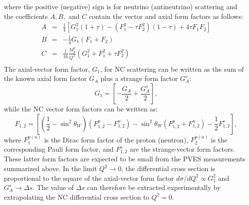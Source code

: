 where the positive (negative) sign is for neutrino (antineutrino) scattering and the coefficients
$A, B,$ and $C$ contain the vector and axial form factors as follows:
\begin{eqnarray*}
A & = &  \frac{1}{4} \left[ G_1^2 \left( 1 +\tau \right) - \left( F_1^2 - \tau F_2^2 \right)
\left( 1 - \tau \right) + 4 \tau F_1 F_2 \right]\\
B & = &- \frac{1}{4} G_1 \left( F_1 + F_2 \right)\\
C & = &  \frac{1}{16} \frac{M_p^2}{Q^2} \left( G_1^2 + F_1^2 + \tau F_2^2 \right) \\
\end{eqnarray*}
The axial-vector form factor, $G_1$, for NC scattering can be written as the sum of the known axial
form factor $G_A$ plus a strange form factor $G_A^s$:
\begin{equation}
G_1 = \left[ - \frac{G_A}{2} + \frac{G_A^s}{2} \right],
\end{equation}
while the NC vector form factors can be written as:
\begin{equation}
F_{1,2} = \left[ \left(\frac{1}{2} - \sin^2 \theta_W \right) \left( F_{1,2}^p - F_{1,2}^n \right)
- \sin^2 \theta_W \left( F_{1,2}^p + F_{1,2}^n \right) - \frac{1}{2} F_{1,2}^s \right],
\end{equation}
where $F_1^{p(n)}$ is the Dirac form factor of the proton (neutron),
$F_2^{p(n)}$ is the corresponding Pauli form factor, and $F_{1,2}^s$
are the strange-vector form factors.  These latter form factors are
expected to be small from the PVES measurements summarized above.  
In the limit $Q^2 \to 0$, the differential cross section is proportional
to the square of the axial-vector form factor $d \sigma / d Q^2
\propto G_1^2$ and $G_A^s \to \Delta s$.  The value of $\Delta s$ can
therefore be extracted experimentally by extrapolating the NC
differential cross section to $Q^2=0$.
